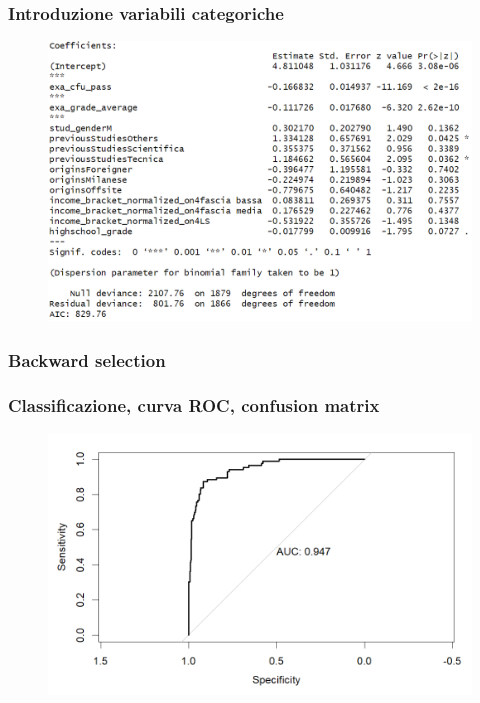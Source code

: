 \documentclass{beamer}
\begin{document}
\begin{frame}
\frametitle{Introduzione variabili categoriche}
\begin{figure}[h]
    \centering
    \includegraphics[width=1.07\textwidth]{Screenshot 2024-05-26 121359.png} %
    \label{}
\end{figure}

\end{frame}


\begin{frame}
\frametitle{Backward selection}
\end{frame}

\begin{frame}
\frametitle{Classificazione, curva ROC, confusion matrix}
\begin{figure}[h]
    \centering
    \includegraphics[width=1\textwidth]{Screenshot 2024-05-26 122028.png} %
    \label{}
\end{figure}
\end{frame}
\end{document}
